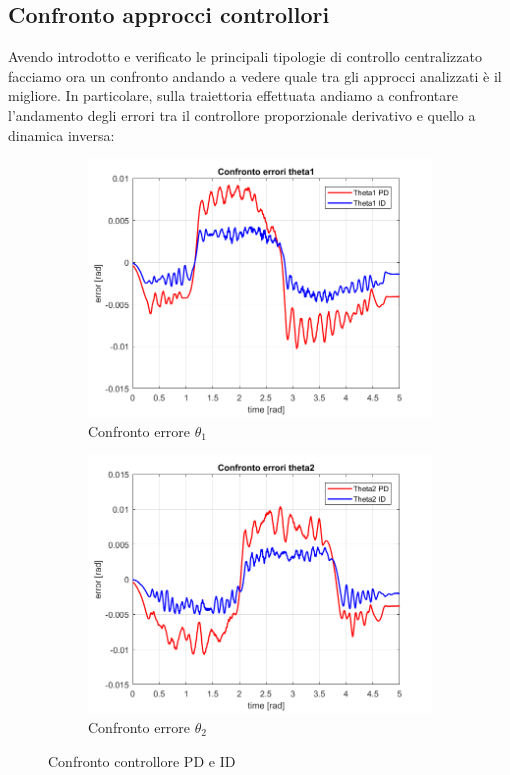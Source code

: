 \subsection{Confronto approcci controllori}
Avendo introdotto e verificato le principali tipologie di controllo centralizzato facciamo ora un confronto andando a vedere quale tra gli approcci analizzati è il migliore. In particolare, sulla traiettoria effettuata andiamo a confrontare l'andamento degli errori tra il controllore proporzionale derivativo e quello a dinamica inversa:
\begin{figure}[!ht]
\begin{subfigure}{.53\textwidth}
  \centering
  \includegraphics[width=.8\linewidth]{Immagini/Traiettorie/ConfontoErroriTheta1}  
  \caption{Confronto errore $\theta_1$ }
  \label{fig:sub-tid1}
\end{subfigure}
\begin{subfigure}{.53\textwidth}
  \centering
  \includegraphics[width=.8\linewidth]{Immagini/Traiettorie/ConfontoErroriTheta2}  
  \caption{Confronto errore $\theta_2$}
  \label{fig:sub-tid2}
\end{subfigure}
\caption{Confronto controllore PD e ID}
\end{figure}
